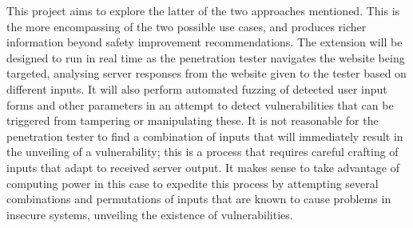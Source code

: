 This project aims to explore the latter of the two approaches mentioned. 
This is the more encompassing of the two possible use cases, and produces richer information beyond safety improvement recommendations. 
The extension will be designed to run in real time as the penetration tester navigates the website being targeted, analysing server responses from the website given to the tester based on different inputs. 
It will also perform automated fuzzing of detected user input forms and other parameters in an attempt to detect vulnerabilities that can be triggered from tampering or manipulating these.
It is not reasonable for the penetration tester to find a combination of inputs that will immediately result in the unveiling of a vulnerability; this is a process that requires careful crafting of inputs that adapt to received server output.
It makes sense to take advantage of computing power in this case to expedite this process by attempting several combinations and permutations of inputs that are known to cause problems in insecure systems, unveiling the existence of vulnerabilities.





